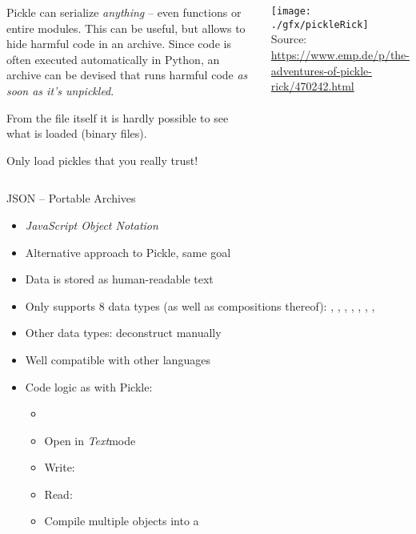 \begin{frame}
%
\begin{columns}[T]
\begin{warnbox}
Pickle can serialize \emph{anything} -- even functions or entire modules. This can be useful, but allows to hide harmful code in an archive. Since code is often executed automatically in Python, an archive can be devised that runs harmful code \emph{as soon as it's unpickled}.

From the file itself it is hardly possible to see what is loaded (binary files).

Only load pickles that you really trust!
\end{warnbox}
%
\begin{center}
\texttt{[image: ./gfx/pickleRick]}\\
\scriptsize Source: \url{https://www.emp.de/p/the-adventures-of-pickle-rick/470242.html}
\end{center}
\end{columns}
%
\end{frame}


\begin{frame}[fragile]{JSON -- Portable Archives}
%
\begin{itemize}
\item \emph{JavaScript Object Notation}
\item Alternative approach to Pickle, same goal
\item Data is stored as human-readable text
\item Only supports 8 data types (as well as compositions thereof): 
	, , , , , , , 
\item Other data types: deconstruct manually
\item Well compatible with other languages
\item Code logic as with Pickle:
	\begin{itemize}
	\item {}
	\item Open in \emph{Text}mode
	\item Write: 
	\item Read: 
	\item Compile multiple objects into a 
	\end{itemize}
\end{itemize}
%
\end{frame}


